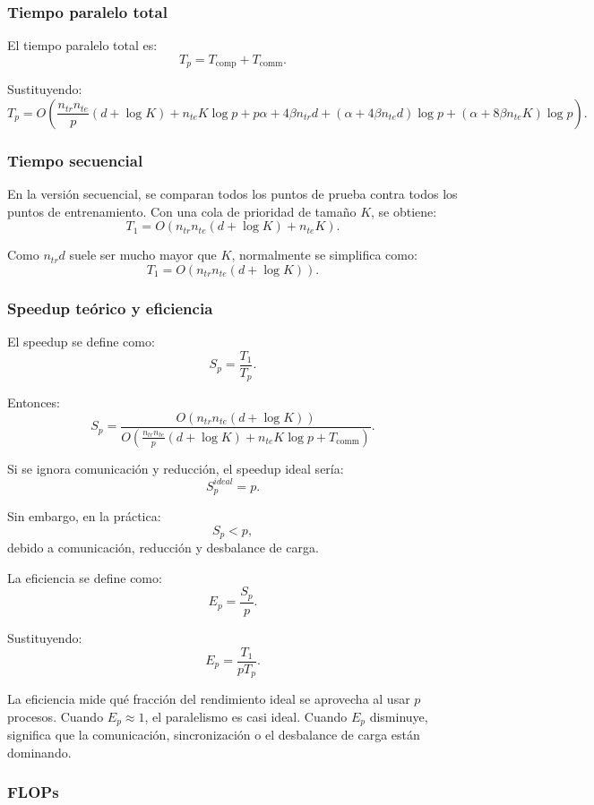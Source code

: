 \documentclass[11pt,a4paper]{article}
\begin{document}
\subsubsection{Tiempo paralelo total}

El tiempo paralelo total es:
\[
T_p = T_{\text{comp}} + T_{\text{comm}}.
\]

Sustituyendo:
\[
\boxed{
T_p
=
O\left(
\frac{n_{tr}n_{te}}{p}(d+\log K)
+
n_{te}K\log p
+
p\alpha
+
4\beta n_{tr}d
+
(\alpha + 4\beta n_{te}d)\log p
+
(\alpha + 8\beta n_{te}K)\log p
\right)
}.
\]

\subsubsection{Tiempo secuencial}

En la versión secuencial, se comparan todos los puntos de prueba contra todos los puntos de
entrenamiento. Con una cola de prioridad de tamaño $K$, se obtiene:
\[
\boxed{
T_1
=
O\left(
n_{tr}n_{te}(d+\log K)
+
n_{te}K
\right)
}.
\]

Como $n_{tr}d$ suele ser mucho mayor que $K$, normalmente se simplifica como:
\[
T_1
=
O(n_{tr}n_{te}(d+\log K)).
\]

\subsubsection{Speedup teórico y eficiencia}

El speedup se define como:
\[
S_p = \frac{T_1}{T_p}.
\]

Entonces:
\[
\boxed{
S_p
=
\frac{
O(n_{tr}n_{te}(d+\log K))
}{
O\left(
\frac{n_{tr}n_{te}}{p}(d+\log K)
+
n_{te}K\log p
+
T_{\text{comm}}
\right)
}
}.
\]

Si se ignora comunicación y reducción, el speedup ideal sería:
\[
S_p^{ideal} = p.
\]

Sin embargo, en la práctica:
\[
S_p < p,
\]
debido a comunicación, reducción y desbalance de carga.

La eficiencia se define como:
\[
E_p = \frac{S_p}{p}.
\]

Sustituyendo:
\[
\boxed{
E_p
=
\frac{T_1}{pT_p}
}.
\]

La eficiencia mide qué fracción del rendimiento ideal se aprovecha al usar $p$ procesos.
Cuando $E_p \approx 1$, el paralelismo es casi ideal. Cuando $E_p$ disminuye, significa que
la comunicación, sincronización o el desbalance de carga están dominando.

\subsubsection{FLOPs}
\end{document}
